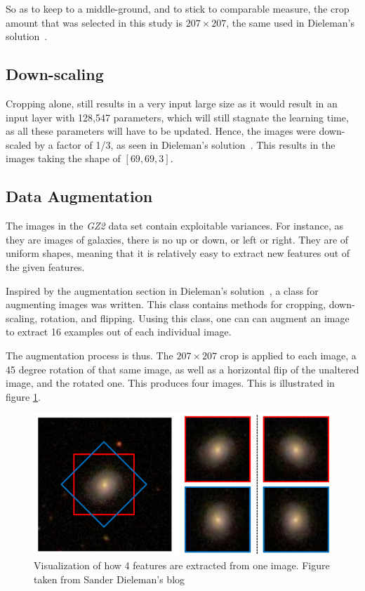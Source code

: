 \documentclass[12pt,a4paper,oneside,oldfontcommands]{memoir}
\begin{document}
So as to keep to a middle-ground, and to stick to comparable measure, the crop amount that was selected in this study is \(207\times207\), the same used in Dieleman's solution~\cite{Sanders-GZ}.

\subsection{Down-scaling}

Cropping alone, still results in a very input large size as it would result in an input layer with 128,547 parameters, which will still stagnate the learning time, as all these parameters will have to be updated. Hence, the images were down-scaled by a factor of 1/3, as seen in Dieleman's solution~\cite{Sanders-GZ}. This results in the images taking the shape of \([69, 69, 3]\).

\subsection{Data Augmentation} \label{aug-section}

The images in the \textit{GZ2} data set contain exploitable variances. For instance, as they are images of galaxies, there is no up or down, or left or right. They are of uniform shapes, meaning that it is relatively easy to extract new features out of the given features. 

Inspired by the augmentation section in Dieleman's solution~\cite{Sanders-GZ}, a class for augmenting images was written. This class contains methods for cropping, down-scaling, rotation, and flipping. Uusing this class, one can can augment an image to extract 16 examples out of each individual image.

The augmentation process is thus. The \(207\times207\) crop is applied to each image, a 45 degree rotation of that same image, as well as a horizontal flip of the unaltered image, and the rotated one. This produces four images. This is illustrated in figure \ref{fig:sanders-aug-1}. 

\begin{figure}[H]
  \centering
    \includegraphics[width=\linewidth]{images/sanders-aug-1.png}
    \caption{Visualization of how 4 features are extracted from one image. Figure taken from Sander Dieleman's blog~\cite{Sanders-GZ}}
    \label{fig:sanders-aug-1}
\end{figure}
\end{document}
